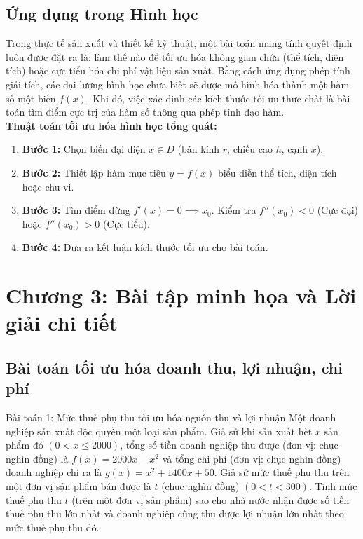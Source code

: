 \documentclass[12pt,a4paper]{article}
\begin{document}
\subsection{Ứng dụng trong Hình học}
Trong thực tế sản xuất và thiết kế kỹ thuật, một bài toán mang tính quyết định luôn được đặt ra là: làm thế nào để tối ưu hóa không gian chứa (thể tích, diện tích) hoặc cực tiểu hóa chi phí vật liệu sản xuất. Bằng cách ứng dụng phép tính giải tích, các đại lượng hình học chưa biết sẽ được mô hình hóa thành một hàm số một biến $f(x)$. Khi đó, việc xác định các kích thước tối ưu thực chất là bài toán tìm điểm cực trị của hàm số thông qua phép tính đạo hàm.
\\
\textbf{Thuật toán tối ưu hóa hình học tổng quát:}
\begin{enumerate}
    \item \textbf{Bước 1:} Chọn biến đại diện $x \in D$ (bán kính $r$, chiều cao $h$, cạnh $x$).
    \item \textbf{Bước 2:} Thiết lập hàm mục tiêu $y = f(x)$ biểu diễn thể tích, diện tích hoặc chu vi.
    \item \textbf{Bước 3:} Tìm điểm dừng $f'(x) = 0 \implies x_0$. Kiểm tra $f''(x_0) < 0$ (Cực đại) hoặc $f''(x_0) > 0$ (Cực tiểu).
    \item \textbf{Bước 4:} Đưa ra kết luận kích thước tối ưu cho bài toán.
\end{enumerate}

\newpage

\section{Chương 3: Bài tập minh họa và Lời giải chi tiết}

\subsection{Bài toán tối ưu hóa doanh thu, lợi nhuận, chi phí}

\begin{problembox}{Bài toán 1: Mức thuế phụ thu tối ưu hóa nguồn thu và lợi nhuận}
Một doanh nghiệp sản xuất độc quyền một loại sản phẩm. Giả sử khi sản xuất hết $x$ sản phẩm đó $(0 < x \le 2000)$, tổng số tiền doanh nghiệp thu được (đơn vị: chục nghìn đồng) là $f(x) = 2000x - x^2$ và tổng chi phí (đơn vị: chục nghìn đồng) doanh nghiệp chi ra là $g(x) = x^2 + 1400x + 50$. Giả sử mức thuế phụ thu trên một đơn vị sản phẩm bán được là $t$ (chục nghìn đồng) $(0 < t < 300)$. Tính mức thuế phụ thu $t$ (trên một đơn vị sản phẩm) sao cho nhà nước nhận được số tiền thuế phụ thu lớn nhất và doanh nghiệp cũng thu được lợi nhuận lớn nhất theo mức thuế phụ thu đó.
\end{problembox}
\end{document}
